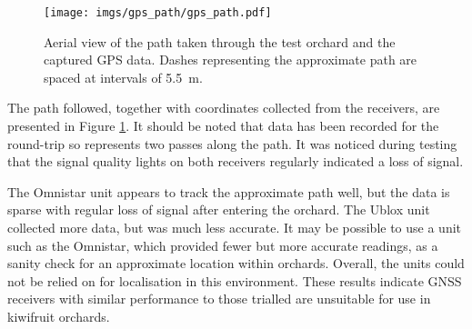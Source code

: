 \documentclass[preprint,authoryear,12pt]{elsarticle}
\begin{document}
        \begin{figure}[htb]
            \centering
            \texttt{[image: imgs/gps\_path/gps\_path.pdf]}
            \caption{
                Aerial view of the path taken through the test orchard and the captured GPS data.
                Dashes representing the approximate path are spaced at intervals of \SI{5.5}{\meter}.
            }
            \label{fig:gpsResults}
        \end{figure}

        The path followed, together with coordinates collected from the receivers, are presented in Figure \ref{fig:gpsResults}.
        It should be noted that data has been recorded for the round-trip so represents two passes along the path.
        It was noticed during testing that the signal quality lights on both receivers regularly indicated a loss of signal.

        The Omnistar unit appears to track the approximate path well, but the data is sparse with regular loss of signal after entering the orchard.
    	The Ublox unit collected more data, but was much less accurate.
        It may be possible to use a unit such as the Omnistar, which provided fewer but more accurate readings, as a sanity check for an approximate location within orchards.
        Overall, the units could not be relied on for localisation in this environment.
        These results indicate GNSS receivers with similar performance to those trialled are unsuitable for use in kiwifruit orchards.





\end{document}
